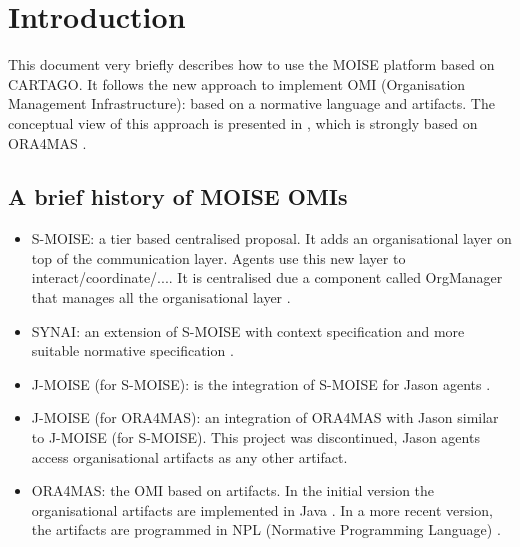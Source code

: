 \documentclass{article}
\begin{document}


\html{\tableofcontents}

\section*{Introduction}

This document very briefly describes how to use the MOISE platform
based on CARTAGO. It follows the new approach to implement OMI
(Organisation Management Infrastructure): based on a normative
language and artifacts. The conceptual view of this approach is
presented in \cite{hubner:09e}, which is strongly based on ORA4MAS
\cite{hubner:09c}.

\subsection*{A brief history of MOISE OMIs}

\begin{itemize}
\item S-MOISE: a tier based centralised proposal. It adds an
  organisational layer on top of the communication layer. Agents use
  this new layer to interact/coordinate/.... It is centralised due a
  component called OrgManager that manages all the organisational
  layer \cite{hubner:05a}.
\item SYNAI: an extension of S-MOISE with context specification and
  more suitable normative specification \cite{gateau:07}.
\item J-MOISE (for S-MOISE): is the integration of S-MOISE for Jason
  agents \cite{hubner:07}. 
\item J-MOISE (for ORA4MAS): an integration of ORA4MAS with Jason
  similar to J-MOISE (for S-MOISE). This project was  discontinued,
  Jason agents access organisational artifacts as any other artifact.
\item ORA4MAS: the OMI based on artifacts. In the initial version the
  organisational artifacts are implemented in Java
  \cite{hubner:09c}. In a more recent version, the artifacts are
  programmed in NPL (Normative Programming Language)
  \cite{hubner:10b}.
\end{itemize}
\end{document}

